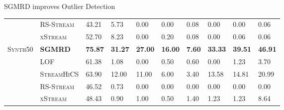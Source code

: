 \documentclass[16pt,usenames,dvipsnames, notheorems]{beamer}
\theoremstyle{definition}
\theoremstyle{example}
\theoremstyle{plain}
\begin{document}
\begin{frame}{SGMRD improves Outlier Detection}
\begin{table}[]
\begin{tabularx}{\textwidth}{@{}llXXXXXXXX@{}}
		& \textsc{RS-Stream}      & 43.21          & 5.73           & 0.00           & 0.00           & 0.08           & 0.00           & 0.00           & 0.06           \\
		& \textsc{xStream}        & 52.70          & 8.23           & 0.00           & 0.20           & 0.08           & 0.00           & 0.06           & 0.06           \\ \midrule
		\textsc{Synth50}   & \textbf{{SGMRD}} & \textbf{75.87} & \textbf{31.27} & \textbf{27.00} & \textbf{16.00} & \textbf{7.60}  & \textbf{33.33} & \textbf{39.51} & \textbf{46.91} \\
		& \textsc{LOF}      & 61.38          & 1.08           & 0.00           & 0.50           & 0.60           & 0.00           & 1.23           & 3.70           \\
		& \textsc{StreamHiCS}     & 63.90          & 12.00          & 11.00          & 6.00           & 3.40           & 13.58          & 14.81          & 20.99          \\
		& \textsc{RS-Stream}      & 46.52          & 0.73           & 0.00           & 0.00           & 0.00           & 0.00           & 0.00           & 0.00           \\
		& \textsc{xStream}        & 48.43          & 0.90           & 1.00           & 0.50           & 1.40           & 1.23           & 1.23           & 8.64           \\ \bottomrule
	\end{tabularx}
\end{table} 

\end{frame}
\end{document}
